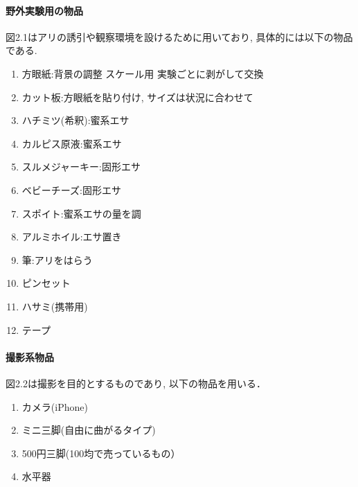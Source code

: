 ﻿\documentclass[a4paper, 12pt]{jsreport}
\begin{document}
\paragraph{野外実験用の物品}
図2.1はアリの誘引や観察環境を設けるために用いており, 具体的には以下の物品である. 
\begin{enumerate}
   \item 方眼紙:背景の調整 スケール用 実験ごとに剥がして交換
   \item カット板:方眼紙を貼り付け, サイズは状況に合わせて
   \item ハチミツ(希釈):蜜系エサ
   \item カルピス原液:蜜系エサ
   \item スルメジャーキー:固形エサ
   \item ベビーチーズ:固形エサ
   \item スポイト:蜜系エサの量を調
   \item アルミホイル:エサ置き
   \item 筆:アリをはらう
   \item ピンセット
   \item ハサミ(携帯用)
   \item テープ
 \end{enumerate}
\paragraph{撮影系物品}
図2.2は撮影を目的とするものであり, 以下の物品を用いる．
\begin{enumerate}
   \item カメラ(iPhone)
   \item ミニ三脚(自由に曲がるタイプ)
   \item 500円三脚(100均で売っているもの）
   \item 水平器
 \end{enumerate}
\end{document}
